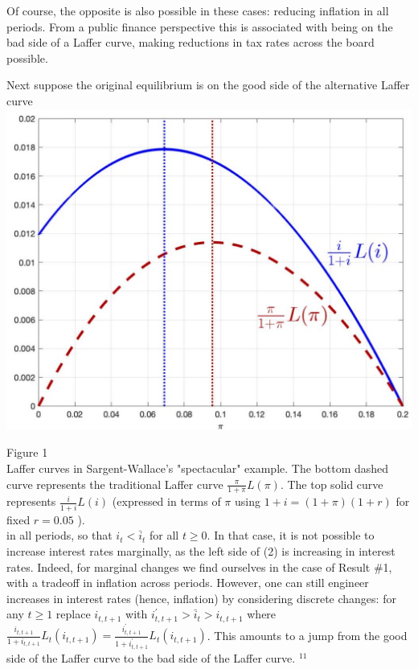 \documentclass[10pt]{article}
\begin{document}
Of course, the opposite is also possible in these cases: reducing inflation in all periods. From a public finance perspective this is associated with being on the bad side of a Laffer curve, making reductions in tax rates across the board possible.

Next suppose the original equilibrium is on the good side of the alternative Laffer curve\\
\includegraphics[max width=\textwidth, center]{2024_12_20_6e24ae1385cdc0ea3304g-08}

Figure 1\\
Laffer curves in Sargent-Wallace's "spectacular" example. The bottom dashed curve represents the traditional Laffer curve $\frac{\pi}{1+\pi} L(\pi)$. The top solid curve represents $\frac{i}{1+i} L(i)$ (expressed in terms of $\pi$ using $1+i=(1+\pi)(1+r)$ for fixed $r=0.05$ ).\\
in all periods, so that $i_{t}<\bar{i}_{t}$ for all $t \geq 0$. In that case, it is not possible to increase interest rates marginally, as the left side of (2) is increasing in interest rates. Indeed, for marginal changes we find ourselves in the case of Result \#1, with a tradeoff in inflation across periods. However, one can still engineer increases in interest rates (hence, inflation) by considering discrete changes: for any $t \geq 1$ replace $i_{t, t+1}$ with $i_{t, t+1}^{\prime}>\bar{i}_{t}>i_{t, t+1}$ where $\frac{i_{t, t+1}}{1+i_{t, t+1}} L_{t}\left(i_{t, t+1}\right)=\frac{i_{t, t+1}^{\prime}}{1+i_{t, t+1}^{\prime}} L_{t}\left(i_{t, t+1}\right)$. This amounts to a jump from the good side of the Laffer curve to the bad side of the Laffer curve. ${ }^{11}$
\end{document}
